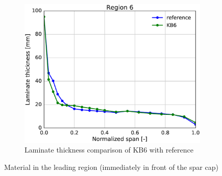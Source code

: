 \begin{figure}[tph]
\begin{subfigure}{\textwidth}
\centering
\includegraphics[width=0.50\linewidth]{figures/KB6_final/KB6_r06_thickness.eps}
\caption{Laminate thickness comparison of KB6 with reference}
\label{subfig:KB6_thick_r06}
\end{subfigure}
\caption{ Material in the leading region (immediately in front of the spar cap)}
\label{fig:KB6_mat_r06}
\end{figure}

